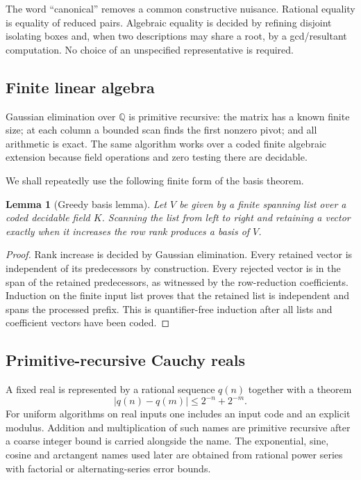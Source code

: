 \documentclass[11pt]{article}
\newtheorem{lemma}[theorem]{Lemma}
\newcommand{\Q}{\mathbb{Q}}
\begin{document}
The word ``canonical'' removes a common constructive nuisance.  Rational equality is equality of reduced pairs.  Algebraic equality is decided by refining disjoint isolating boxes and, when two descriptions may share a root, by a gcd/resultant computation.  No choice of an unspecified representative is required.

\subsection{Finite linear algebra}

Gaussian elimination over $\Q$ is primitive recursive: the matrix has a known finite size; at each column a bounded scan finds the first nonzero pivot; and all arithmetic is exact.  The same algorithm works over a coded finite algebraic extension because field operations and zero testing there are decidable.

We shall repeatedly use the following finite form of the basis theorem.

\begin{lemma}[Greedy basis lemma]
Let $V$ be given by a finite spanning list over a coded decidable field $K$.  Scanning the list from left to right and retaining a vector exactly when it increases the row rank produces a basis of $V$.
\end{lemma}

\begin{proof}
Rank increase is decided by Gaussian elimination.  Every retained vector is independent of its predecessors by construction.  Every rejected vector is in the span of the retained predecessors, as witnessed by the row-reduction coefficients.  Induction on the finite input list proves that the retained list is independent and spans the processed prefix.  This is quantifier-free induction after all lists and coefficient vectors have been coded.
\end{proof}

\subsection{Primitive-recursive Cauchy reals}

A fixed real is represented by a rational sequence $q(n)$ together with a theorem
\[
  |q(n)-q(m)|\le 2^{-n}+2^{-m}.
\]
For uniform algorithms on real inputs one includes an input code and an explicit modulus.  Addition and multiplication of such names are primitive recursive after a coarse integer bound is carried alongside the name.  The exponential, sine, cosine and arctangent names used later are obtained from rational power series with factorial or alternating-series error bounds.
\end{document}
